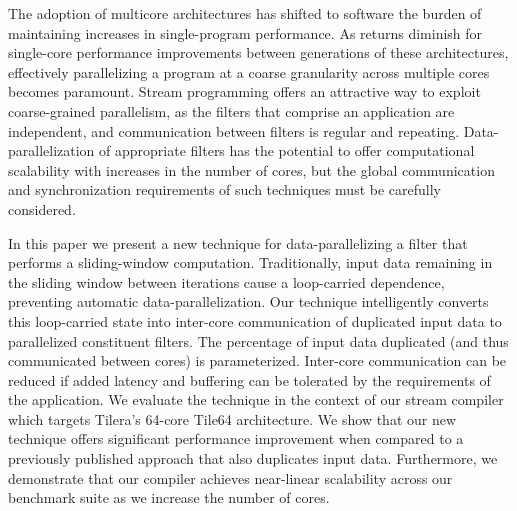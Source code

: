 The adoption of multicore architectures has shifted to software the
burden of maintaining increases in single-program performance. As
returns diminish for single-core performance improvements between
generations of these architectures, effectively parallelizing a
program at a coarse granularity across multiple cores becomes
paramount. Stream programming offers an attractive way to exploit
coarse-grained parallelism, as the filters that comprise an
application are independent, and communication between filters is
regular and repeating. Data-parallelization of appropriate filters has
the potential to offer computational scalability with increases in the
number of cores, but the global communication and synchronization
requirements of such techniques must be carefully considered.

In this paper we present a new technique for data-parallelizing a
filter that performs a sliding-window computation. Traditionally,
input data remaining in the sliding window between iterations cause a
loop-carried dependence, preventing automatic
data-parallelization. Our technique intelligently converts this
loop-carried state into inter-core communication of duplicated input
data to parallelized constituent filters. The percentage of input data
duplicated (and thus communicated between cores) is parameterized.
Inter-core communication can be reduced if added latency and buffering
can be tolerated by the requirements of the application. We evaluate
the technique in the context of our stream compiler which targets
Tilera's 64-core Tile64 architecture.  We show that our new
technique offers significant performance improvement when compared to
a previously published approach that also duplicates input data.
Furthermore, we demonstrate that our compiler achieves near-linear
scalability across our benchmark suite as we increase the number of
cores.


